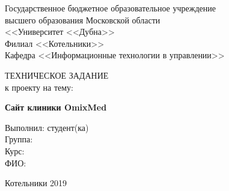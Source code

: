 \begin{titlepage}
\newpage

\begin{center}
Государственное бюджетное образовательное учреждение \\
высшего образования Московской области \\
<<Университет <<Дубна>> \\
Филиал <<Котельники>> \\
\vspace{1cm}
Кафедра <<Информационные технологии в управлении>>
\end{center}

\vspace{2em}

\begin{center}
ТЕХНИЧЕСКОЕ ЗАДАНИЕ \\ к проекту на тему:
\end{center}

\begin{center}
\textbf{Сайт клиники OmixMed}
\end{center}

\vspace{6em}

\begin{flushleft}
\hfill \hfill Выполнил: студент(ка) \\
\hfill \hfill Группа: \hrulefill \\
\hfill \hfill Курс: \hrulefill \\
\hfill \hfill ФИО: \hrulefill \\

\end{flushleft}

\vspace{\fill}

\begin{center}
Котельники 2019
\end{center}

\end{titlepage}